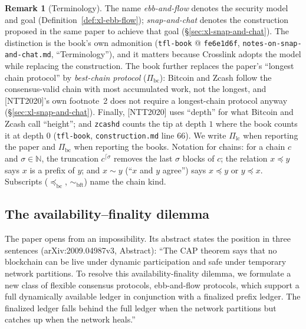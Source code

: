 \documentclass[11pt,a4paper]{article}
\theoremstyle{definition}
\newtheorem{remark}[theorem]{Remark}
\newcommand{\N}{\mathbb{N}}
\begin{document}
\begin{remark}[Terminology]\label{rem:xl-model-terms}
The name \emph{ebb-and-flow} denotes the security model and goal
(Definition~\ref{def:xl-ebb-flow}); \emph{snap-and-chat} denotes the
construction proposed in the same paper to achieve that goal
(\S\ref{sec:xl-snap-and-chat}). The distinction is the book's own
admonition (\texttt{tfl-book} @ \texttt{fe6e1d6f},
\texttt{notes-on-snap-and-chat.md}, ``Terminology''), and it matters
because Crosslink adopts the model while replacing the construction. The
book further replaces the paper's ``longest chain protocol'' by
\emph{best-chain protocol} ($\Pi_{\mathrm{bc}}$): Bitcoin and Zcash follow
the consensus-valid chain with most accumulated work, not the longest, and
[NTT2020]'s own footnote~2 does not require a longest-chain protocol
anyway (\S\ref{sec:xl-snap-and-chat}). Finally, [NTT2020] uses ``depth''
for what Bitcoin and Zcash call ``height''; and \texttt{zcashd} counts the
tip at depth $1$ where the book counts it at depth $0$ (\texttt{tfl-book},
\texttt{construction.md} line 66). We write $\Pi_{\mathrm{lc}}$ when
reporting the paper and $\Pi_{\mathrm{bc}}$ when reporting the books.
Notation for chains: for a chain $c$ and $\sigma \in \N$, the truncation
$c^{\lceil\sigma}$ removes the last $\sigma$ blocks of $c$; the relation
$x \preceq y$ says $x$ is a prefix of $y$; and $x \sim y$ (``$x$ and $y$
agree'') says $x \preceq y$ or $y \preceq x$. Subscripts
($\preceq_{\mathrm{bc}}$, $\sim_{\mathrm{bft}}$) name the chain kind.
\end{remark}

\subsection{The availability--finality dilemma}\label{sec:xl-dilemma}

The paper opens from an impossibility. Its abstract states the position in
three sentences (arXiv:2009.04987v3, Abstract): ``The CAP theorem says that
no blockchain can be live under dynamic participation and safe under
temporary network partitions. To resolve this availability-finality
dilemma, we formulate a new class of flexible consensus protocols,
ebb-and-flow protocols, which support a full dynamically available ledger
in conjunction with a finalized prefix ledger. The finalized ledger falls
behind the full ledger when the network partitions but catches up when the
network heals.''
\end{document}
